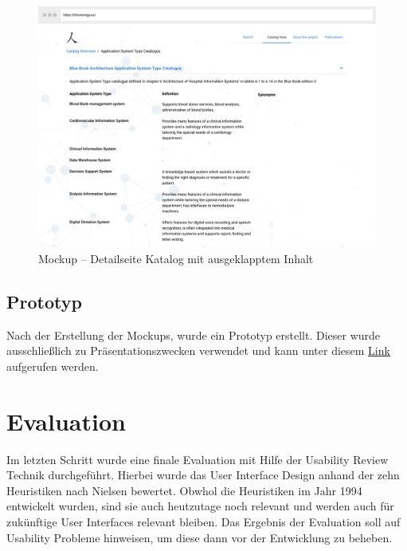 \clearpage

\begin{figure}[ht]
	\centering
    	\includegraphics[width=1.45\textwidth, angle=-90]{Images/Mockup_Katalog_Detailseite_Ausgeklappt}
   	\caption[Mockup -- Detailseite Katalog 2]{Mockup -- Detailseite Katalog mit ausgeklapptem Inhalt}
   	\label{fig:mockup_catalogue_detail_expanded}
\end{figure}

\clearpage

\subsection{Prototyp}

Nach der Erstellung der Mockups, wurde ein Prototyp erstellt.
Dieser wurde ausschließlich zu Präsentationszwecken verwendet und kann unter diesem \href{https://figma.fun/71cjZX}{Link} aufgerufen werden.

\section{Evaluation}

Im letzten Schritt wurde eine finale Evaluation mit Hilfe der Usability Review Technik durchgeführt.
Hierbei wurde das User Interface Design anhand der zehn Heuristiken nach Nielsen bewertet.
Obwhol die Heuristiken im Jahr 1994 entwickelt wurden, sind sie auch heutzutage noch relevant und werden auch für zukünftige User Interfaces relevant bleiben. \citep[vgl.]{jakob_2020}
Das Ergebnis der Evaluation soll auf Usability Probleme hinweisen, um diese dann vor der Entwicklung zu beheben.

